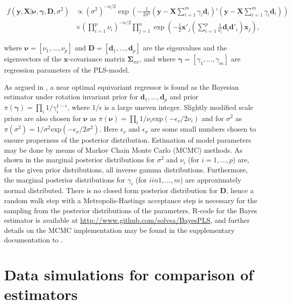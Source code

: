 \documentclass[num-refs]{wiley-article}
\begin{document}
\begin{equation}
  \label{likelihood}
  \begin{split}
    f(\bm{y},\bm{X}|\bm{\nu}, \bm{\gamma}, \bm{D},\sigma^2) &\propto (\sigma^2)^{-n/2}
    \exp\left(-\frac{1}{2\sigma^2}(\bm{y}-\bm{X}\sum_{i=1}^{m}\gamma_i \bm{d}_i)'(\bm{y}-\bm{X}\sum_{i=1}^{m}\gamma_i \bm{d}_i)\right)\\
    &\times (\prod_{i=1}^{p}\nu_i)^{-n/2}\prod_{j=1}^{n}\exp\left(-\frac{1}{2} \bm{x}'_j(\sum_{i=1}^{p}\frac{1}{\nu_i}\bm{d}_i \bm{d}'_i)\bm{x}_j  \right),
  \end{split}
\end{equation}

where $\bm{\nu}=[\nu_1,...,\nu_p]$ and $\bm{D}=[\bm{d}_1,...,\bm{d}_p]$ are the eigenvalues and the eigenvectors of the $\bm{x}$-covariance matrix $\bm{\Sigma}_{xx}$, and where $\bm{\gamma}=[\gamma_1,...,\gamma_m]$ are regression parameters of the PLS-model.

As argued in \citet{helland2012near}, a near optimal equivariant regressor is
found as the Bayesian estimator under rotation invariant prior for
$\bm{d}_1,...,\bm{d}_p$ and prior $\pi(\bm{\gamma})=\prod_i
1/\gamma_i^{1-\epsilon}$, where $1/\epsilon$ is a large uneven integer. Slightly
modified scale priors are also chosen for $\bm{\nu}$ as $\pi(\bm{\nu}) =\prod_i
1/\nu_i \mathrm{exp}(-\epsilon_\nu/2\nu_i)$ and for $\sigma^2$ as$ \pi(\sigma^2)=1/\sigma^2\mathrm{exp}(-\epsilon_\sigma/2\sigma^2)$. Here $\epsilon_\nu$ and $\epsilon_\sigma$ are some small numbers chosen to ensure properness of the posterior distribution. Estimation of model parameters may be done by means of Markov Chain Monte Carlo (MCMC) methods. As shown in \citet{helland2012near} the marginal posterior distributions for $\sigma^2$ and $\nu_i$ (for $i = 1,\ldots, p$) are, for the given prior distributions, all inverse gamma distributions. Furthermore, the marginal posterior distributions for $\gamma_i$ (for $i in 1,\ldots, m$) are approximately normal distributed. There is no closed form posterior distribution for $\bm{D}$, hence a random walk step with a Metropolis-Hastings acceptance step is necessary for the sampling from the posterior distributions of the parameters. R-code for the Bayes estimator is available at \href{http://www.github.com/solvsa/BayesPLS}{http://www.github.com/solvsa/BayesPLS}, and further details on the MCMC implementation may be found in the supplementary documentation to \citet{helland2012near}.


\section{Data simulations for comparison of estimators}
\label{sec:data-simulation}
\end{document}

